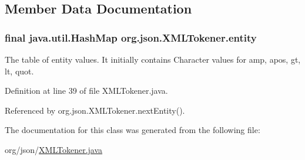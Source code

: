\subsection{Member Data Documentation}
\hypertarget{classorg_1_1json_1_1_x_m_l_tokener_ac0e11bf2c9d16e89993773e8510d44b7}{
\subsubsection[{entity}]{\setlength{\rightskip}{0pt plus 5cm}final java.\-util.\-Hash\-Map org.\-json.\-X\-M\-L\-Tokener.\-entity\hspace{0.3cm}{\ttfamily [static]}}}\label{classorg_1_1json_1_1_x_m_l_tokener_ac0e11bf2c9d16e89993773e8510d44b7}
The table of entity values. It initially contains Character values for amp, apos, gt, lt, quot. 

Definition at line 39 of file X\-M\-L\-Tokener.\-java.



Referenced by org.\-json.\-X\-M\-L\-Tokener.\-next\-Entity().



The documentation for this class was generated from the following file\-:\begin{DoxyCompactItemize}
\item 
org/json/\hyperlink{_x_m_l_tokener_8java}{X\-M\-L\-Tokener.\-java}\end{DoxyCompactItemize}
